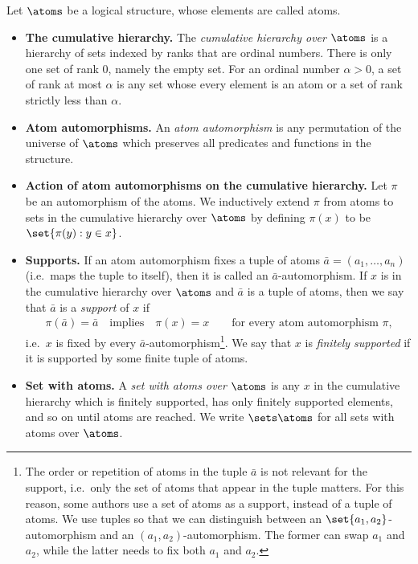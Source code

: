 \begin{definition} 
	Let $\atoms$ be a logical structure, whose elements are called atoms.
	\begin{itemize}
		\item {\bf The cumulative hierarchy.} The \emph{cumulative hierarchy over $\atoms$} is a hierarchy of sets indexed by ranks that are ordinal numbers. There is only one set of rank $0$, namely the empty set. For an ordinal number $\alpha > 0$, a set of rank at most $\alpha$ is any set whose every element is an atom or a set of rank strictly less than $\alpha$.
		\item {\bf Atom automorphisms.} An \emph{atom automorphism} is any permutation of the universe of $\atoms$ which preserves all predicates and functions in the structure.
		\item {\bf Action of atom automorphisms on the cumulative hierarchy.} Let $\pi$ be an automorphism of the atoms. We inductively extend $\pi$ from atoms to sets in the cumulative hierarchy over $\atoms$ by defining $\pi(x)$ to be $\set{\pi(y) : y \in x}$.
		\item {\bf Supports.} If an atom automorphism fixes a tuple of atoms $\bar a = (a_1,\ldots,a_n)$ (i.e.~maps the tuple to itself), then it is called an $\bar a$-automorphism. If $x$ is in the cumulative hierarchy over $\atoms$ and $\bar a$ is a tuple of atoms, then we say that $\bar a$ is a \emph{support} of $x$ if 
		\begin{align*}
			\pi(\bar a) =\bar a \quad \text{implies} \quad \pi(x)=x \qquad \text{for every atom automorphism $\pi$,}
		\end{align*}
		i.e.~$x$ is fixed by every $\bar a$-automorphism\footnote{The order or repetition of atoms in the tuple $\bar a$ is not relevant for the support, i.e.~only the set of atoms that appear in the tuple matters. For this reason, some authors use a set of atoms as a support, instead of a tuple of atoms. We use tuples so that we can distinguish between an $\set{a_1,a_2}$-automorphism and an $(a_1,a_2)$-automorphism. The former can swap $a_1$ and $a_2$, while the latter needs to fix both $a_1$ and $a_2$.}.		We say that $x$ is \emph{finitely supported} if it is supported by some finite tuple of atoms.
		\item {\bf Set with atoms.} A \emph{set with atoms over $\atoms$} is any $x$ in the cumulative hierarchy which is finitely supported, has only finitely supported elements, and so on until atoms are reached. We write $\sets \atoms$ for all sets with atoms over $\atoms$. 
	\end{itemize}
	
\end{definition}


